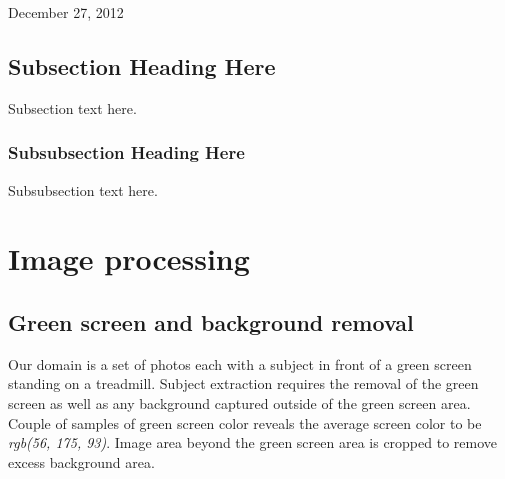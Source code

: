 \documentclass[10pt,journal,compsoc]{IEEEtran}
\begin{document}
\hfill December 27, 2012

\subsection{Subsection Heading Here}
Subsection text here.


\subsubsection{Subsubsection Heading Here}
Subsubsection text here.




\section{Image processing}

\subsection{Green screen and background removal}
Our domain is a set of photos each with a subject in front of a green screen standing on a treadmill. Subject extraction requires the removal of the green screen as well as any background captured outside of the green screen area. Couple of samples of green screen color reveals the average screen color to be \textit{rgb(56, 175, 93)}. Image area beyond the green screen area is cropped to remove excess background area. 
\end{document}
